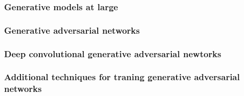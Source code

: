\subsubsection{Generative models at large}
\subsubsection{Generative adversarial networks}
\subsubsection{Deep convolutional generative adversarial newtorks}
\subsubsection{Additional techniques for traning generative adversarial networks}
